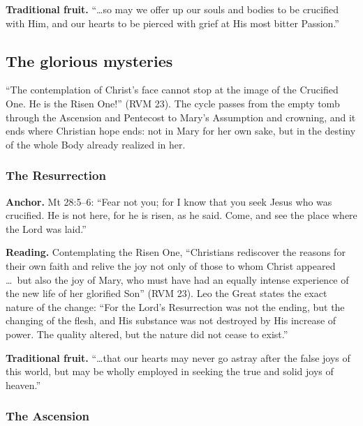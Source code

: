 \textbf{Traditional fruit.} ``\ldots so may we offer up our souls and
bodies to be crucified with Him, and our hearts to be pierced with grief
at His most bitter Passion.''

\subsection{The glorious mysteries}

``The contemplation of Christ's face cannot stop at the image of the
Crucified One. He is the Risen One!'' (RVM 23). The cycle passes from
the empty tomb through the Ascension and Pentecost to Mary's Assumption
and crowning, and it ends where Christian hope ends: not in Mary for her
own sake, but in the destiny of the whole Body already realized in her.

\subsubsection{The Resurrection}

\textbf{Anchor.} Mt 28:5--6: ``Fear not you; for I know that you seek
Jesus who was crucified. He is not here, for he is risen, as he said.
Come, and see the place where the Lord was laid.''

\textbf{Reading.} Contemplating the Risen One, ``Christians rediscover
the reasons for their own faith and relive the joy not only of those to
whom Christ appeared \ldots\ but also the joy of Mary, who must have had
an equally intense experience of the new life of her glorified Son''
(RVM 23). Leo the Great states the exact nature of the change: ``For the
Lord's Resurrection was not the ending, but the changing of the flesh,
and His substance was not destroyed by His increase of power. The quality
altered, but the nature did not cease to exist.''

\textbf{Traditional fruit.} ``\ldots that our hearts may never go astray
after the false joys of this world, but may be wholly employed in seeking
the true and solid joys of heaven.''

\subsubsection{The Ascension}

